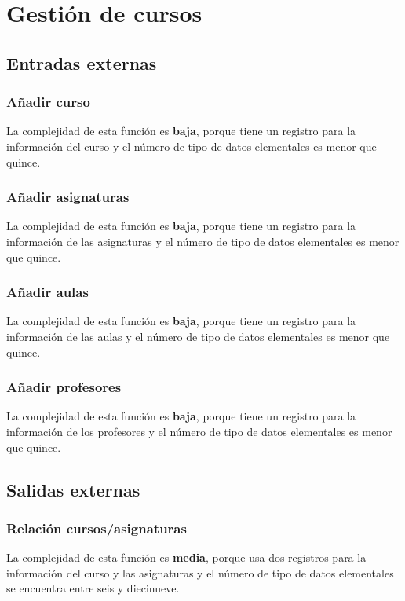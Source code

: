 \documentclass[11pt,a4paper,spanish,twoside]{book}
\begin{document}
\section{Gestión de cursos}
\subsection{Entradas externas}
\subsubsection{Añadir curso}
La complejidad de esta función es \textbf{baja}, porque tiene un
registro para la información del curso y el número de tipo de datos
elementales es menor que quince.

\subsubsection{Añadir asignaturas}
La complejidad de esta función es \textbf{baja}, porque tiene un
registro para la información de las asignaturas y el número de tipo de datos
elementales es menor que quince.

\subsubsection{Añadir aulas}
La complejidad de esta función es \textbf{baja}, porque tiene un
registro para la información de las aulas y el número de tipo de datos
elementales es menor que quince.

\subsubsection{Añadir profesores}
La complejidad de esta función es \textbf{baja}, porque tiene un
registro para la información de los profesores y el número de tipo de datos
elementales es menor que quince.

\subsection{Salidas externas}
\subsubsection{Relación cursos/asignaturas}
La complejidad de esta función es \textbf{media}, porque usa dos
registros para la información del curso y las asignaturas y el número de tipo
de datos elementales se encuentra entre seis y diecinueve.
\end{document}
